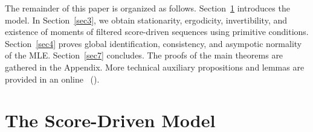 
The remainder of this paper is organized as follows.
Section~\ref{sec2} introduces the model.
In Section~\ref{sec3}, we obtain stationarity, ergodicity, 
invertibility, and existence of moments of filtered score-driven sequences using primitive conditions. 
Section~\ref{sec4} proves global identification, consistency, and asympotic normality of the MLE.
Section~\ref{sec7} concludes. 
The proofs of the main theorems are gathered in the Appendix. 
More technical auxiliary propositions and lemmas are provided in an online \SupplementaryAppendix\ (\SupplementaryAppendixAbbrev).



\section{The Score-Driven Model} %
\label{sec2}


